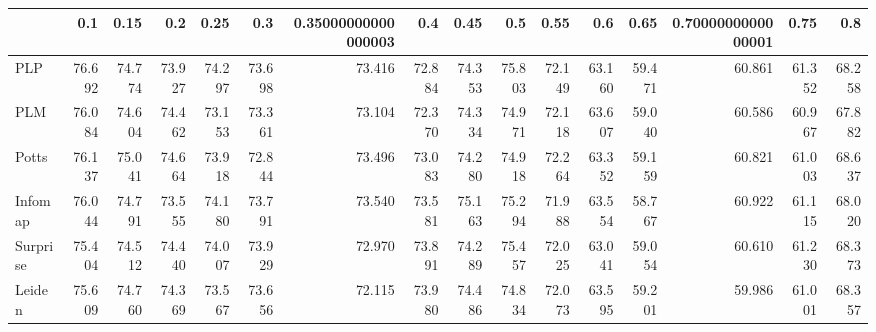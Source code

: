 \begin{tabular}{lrrrrrrrrrrrrrrr}
\toprule
{} &    0.1 &   0.15 &    0.2 &   0.25 &    0.3 & 0.35000000000000003 &    0.4 &   0.45 &    0.5 &   0.55 &    0.6 &   0.65 & 0.7000000000000001 &   0.75 &    0.8 \\
\midrule
PLP      & 76.692 & 74.774 & 73.927 & 74.297 & 73.698 &              73.416 & 72.884 & 74.353 & 75.803 & 72.149 & 63.160 & 59.471 &             60.861 & 61.352 & 68.258 \\
PLM      & 76.084 & 74.604 & 74.462 & 73.153 & 73.361 &              73.104 & 72.370 & 74.334 & 74.971 & 72.118 & 63.607 & 59.040 &             60.586 & 60.967 & 67.882 \\
Potts    & 76.137 & 75.041 & 74.664 & 73.918 & 72.844 &              73.496 & 73.083 & 74.280 & 74.918 & 72.264 & 63.352 & 59.159 &             60.821 & 61.003 & 68.637 \\
Infomap  & 76.044 & 74.791 & 73.555 & 74.180 & 73.791 &              73.540 & 73.581 & 75.163 & 75.294 & 71.988 & 63.554 & 58.767 &             60.922 & 61.115 & 68.020 \\
Surprise & 75.404 & 74.512 & 74.440 & 74.007 & 73.929 &              72.970 & 73.891 & 74.289 & 75.457 & 72.025 & 63.041 & 59.054 &             60.610 & 61.230 & 68.373 \\
Leiden   & 75.609 & 74.760 & 74.369 & 73.567 & 73.656 &              72.115 & 73.980 & 74.486 & 74.834 & 72.073 & 63.595 & 59.201 &             59.986 & 61.001 & 68.357 \\
\bottomrule
\end{tabular}
